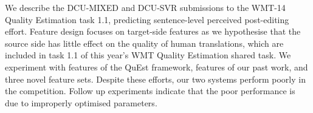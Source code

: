 We describe the DCU-MIXED and DCU-SVR submissions to the WMT-14 Quality Estimation task 1.1, predicting sentence-level perceived post-editing effort. Feature design focuses on target-side features as we hypothesise that the source side has little effect on the quality of human translations, which are included in task 1.1 of this year's WMT Quality Estimation shared task. We experiment with features of the QuEst framework, features of our past work, and three novel feature sets. Despite these efforts, our two systems perform poorly in the competition. Follow up experiments indicate that the poor performance is due to improperly optimised parameters.

